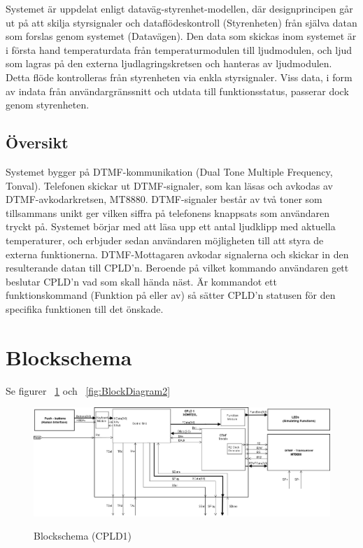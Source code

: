 \documentclass[a4paper,11pt]{article}
\begin{document}
	Systemet är uppdelat enligt dataväg-styrenhet-modellen, där designprincipen går ut på att skilja styrsignaler
	och dataflödeskontroll (Styrenheten) från själva datan som forslas genom systemet (Datavägen). Den data som
	skickas inom systemet är i första hand temperaturdata från temperaturmodulen till ljudmodulen, och ljud som
	lagras på den externa ljudlagringskretsen och hanteras av ljudmodulen. Detta flöde kontrolleras från styrenheten via
	enkla styrsignaler. Viss data, i form av indata från användargränssnitt och utdata till funktionsstatus, passerar
	dock genom styrenheten.

	\subsection{Översikt}

	Systemet bygger på DTMF-kommunikation (Dual Tone Multiple Frequency, Tonval). Telefonen skickar ut DTMF-signaler, som kan
	läsas och avkodas av DTMF-avkodarkretsen, MT8880. DTMF-signaler består av två toner som tillsammans unikt ger vilken
	siffra på telefonens knappsats som användaren tryckt på. Systemet börjar med att läsa upp ett antal ljudklipp med
	aktuella temperaturer, och erbjuder sedan användaren möjligheten till att styra de externa funktionerna.
DTMF-Mottagaren avkodar signalerna och skickar in den resulterande
	datan till CPLD'n. Beroende på vilket kommando användaren gett beslutar CPLD'n vad som skall hända näst. Är kommandot ett
	funktionskommand (Funktion på eller av) så sätter CPLD'n statusen för den specifika funktionen till det önskade. 

\section{Blockschema}

	Se figurer ~\ref{fig:BlockDiagram1} och ~\ref{fig:BlockDiagram2}

	\begin{figure}[ht!]
	  \centering
	      \includegraphics[scale=0.48, angle=90]{BlockDiagramCPLD1.png}
		\label{fig:BlockDiagram1}
	  	\caption{Blockschema (CPLD1)}
	\end{figure}
\end{document}

